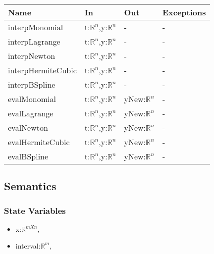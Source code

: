 \documentclass[12pt, titlepage]{article}
\begin{document}
\begin{center}
\begin{tabular}{p{4cm} p{4cm} p{4cm} p{3cm}}
\hline
\textbf{Name} & \textbf{In} & \textbf{Out} & \textbf{Exceptions} \\
\hline
interpMonomial & t:$\mathbb{R}^n$,y:$\mathbb{R}^n$  & - & - \\
interpLagrange & t:$\mathbb{R}^n$,y:$\mathbb{R}^n$ & - & - \\
interpNewton & t:$\mathbb{R}^n$,y:$\mathbb{R}^n$ & - & - \\
interpHermiteCubic & t:$\mathbb{R}^n$,y:$\mathbb{R}^n$ & - & 
- \\
interpBSpline & t:$\mathbb{R}^n$,y:$\mathbb{R}^n$ & - & - \\

evalMonomial & t:$\mathbb{R}^n$,y:$\mathbb{R}^n$ & yNew:$\mathbb{R}^n$  & - \\
evalLagrange & t:$\mathbb{R}^n$,y:$\mathbb{R}^n$ & yNew:$\mathbb{R}^n$ & - \\
evalNewton & t:$\mathbb{R}^n$,y:$\mathbb{R}^n$ & yNew:$\mathbb{R}^n$ & - \\
evalHermiteCubic & t:$\mathbb{R}^n$,y:$\mathbb{R}^n$ & yNew:$\mathbb{R}^n$ & - 
\\
evalBSpline & t:$\mathbb{R}^n$,y:$\mathbb{R}^n$ & yNew:$\mathbb{R}^n$ & - \\
\hline
\end{tabular}
\end{center}

\subsection{Semantics}

\subsubsection{State Variables}
\begin{itemize}
	\item x:$\mathbb{R}^{m X n}$, \\
	
	\item interval:$\mathbb{R}^m$,  \\
	
\end{itemize}
\end{document}
